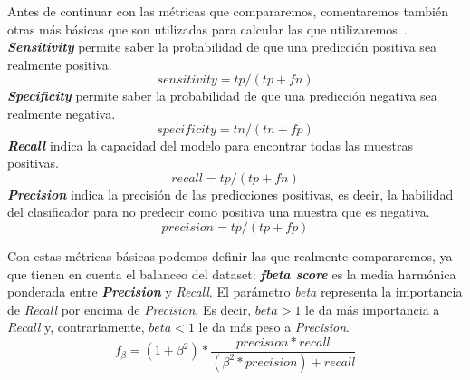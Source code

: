 Antes de continuar con las métricas que compararemos, comentaremos también otras más básicas que son utilizadas para calcular las que utilizaremos\ \cite{Precisio23:online}.
\\ \textit{\textbf{Sensitivity}} permite saber la probabilidad de que una predicción positiva sea realmente positiva.
    \begin{equation}
        sensitivity=tp/(tp+fn)
    \end{equation}
\textit{\textbf{Specificity}} permite saber la probabilidad de que una predicción negativa sea realmente negativa.
\begin{equation}
        specificity=tn/(tn+fp)
    \end{equation}
\textit{\textbf{Recall}} indica la capacidad del modelo para encontrar todas las muestras positivas. 
    \begin{equation}
        recall=tp/(tp+fn)
    \end{equation}
\textit{\textbf{Precision}} indica la precisión de las predicciones positivas, es decir, la habilidad del clasificador para no predecir como positiva una muestra que es negativa.
    \begin{equation}
        precision=tp/(tp+fp)
    \end{equation}

Con estas métricas básicas podemos definir las que realmente compararemos, ya que tienen en cuenta el balanceo del \gls{dataset}:
\textit{\textbf{fbeta score}} es la media harmónica ponderada entre \textit{\textbf{Precision}} y \textit{Recall}. 
El parámetro \textit{beta} representa la importancia de \textit{Recall} por encima de \textit{Precision}. 
Es decir, \(beta>1\) le da más importancia a \textit{Recall} y, contrariamente, \(beta<1\) le da más peso a \textit{Precision}.\ \cite{FscoreWi30:online}
    \begin{equation}
        f_\beta = (1 + \beta^2)*\frac{precision*recall}{(\beta^2*precision)+recall}
    \end{equation}

